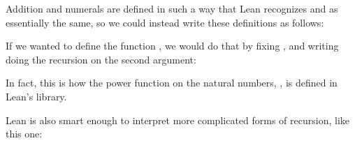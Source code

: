 \documentclass[letterpaper,10pt,english]{sphinxmanual}
\begin{document}
\sphinxAtStartPar
Addition and numerals are defined in such a way that Lean recognizes  and  as essentially the same, so we could instead write these definitions as follows:

\begin{sphinxVerbatim}[commandchars=\\\{\}]
     
         
        

     
         
          
\end{sphinxVerbatim}

\sphinxAtStartPar
If we wanted to define the function , we would do that by fixing , and writing doing the recursion on the second argument:

\begin{sphinxVerbatim}[commandchars=\\\{\}]
        
          
          
\end{sphinxVerbatim}

\sphinxAtStartPar
In fact, this is how the power function on the natural numbers,
, is defined in Lean’s library.

\sphinxAtStartPar
Lean is also smart enough to interpret more complicated forms of recursion, like this one:
\end{document}
